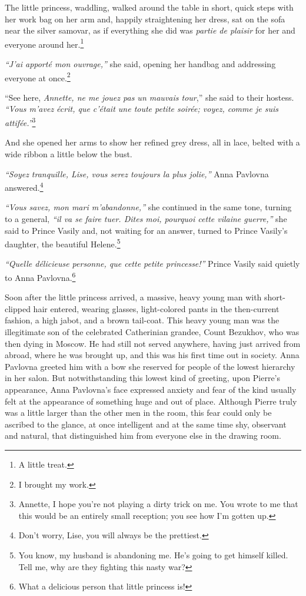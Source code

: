 The little princess, waddling, walked around the table in short, quick
steps with her work bag on her arm and, happily straightening her
dress, sat on the sofa near the silver samovar, as if everything she
did was \textit{partie de plaisir} for her and everyone around
her.\footnote{A little treat.}

\textit{``J'ai apport\'e mon ouvrage,''} she said, opening her handbag
and addressing everyone at once.\footnote{I brought my work.}

``See here, \textit{Annette, ne me jouez pas un mauvais tour},'' she
said to their hostess. \textit{``Vous m'avez \'ecrit, que c'\'etait
  une toute petite soir\'ee; voyez, comme je suis
  attif\'ee.''}\footnote{Annette, I hope you're not playing a dirty
  trick on me. You wrote to me that this would be an entirely small
  reception; you see how I'm gotten up.}

And she opened her arms to show her refined grey dress, all in lace,
belted with a wide ribbon a little below the bust.

\textit{``Soyez tranquille, Lise, vous serez toujours la plus
  jolie,''} Anna Pavlovna answered.\footnote{Don't worry, Lise, you
  will always be the prettiest.}

\textit{``Vous savez, mon mari m'abandonne,''} she continued in the
same tone, turning to a general, \textit{``il va se faire tuer. Dites
  moi, pourquoi cette vilaine guerre,''} she said to Prince Vasily
and, not waiting for an answer, turned to Prince Vasily's daughter,
the beautiful Helene.\footnote{You know, my husband is abandoning
  me. He's going to get himself killed. Tell me, why are they fighting
  this nasty war?}

\textit{``Quelle d\'elicieuse personne, que cette petite princesse!''}
Prince Vasily said quietly to Anna Pavlovna.\footnote{What a delicious
  person that little princess is!}

Soon after the little princess arrived, a massive, heavy young man
with short-clipped hair entered, wearing glasses, light-colored pants
in the then-current fashion, a high jabot, and a brown tail-coat. This
heavy young man was the illegitimate son of the celebrated Catherinian
grandee, Count Bezukhov, who was then dying in Moscow. He had still
not served anywhere, having just arrived from abroad, where he was
brought up, and this was his first time out in society. Anna Pavlovna
greeted him with a bow she reserved for people of the lowest hierarchy
in her salon. But notwithstanding this lowest kind of greeting, upon
Pierre's appearance, Anna Pavlovna's face expressed anxiety and fear
of the kind usually felt at the appearance of something huge and out
of place. Although Pierre truly was a little larger than the other men
in the room, this fear could only be ascribed to the glance, at once
intelligent and at the same time shy, observant and natural, that
distinguished him from everyone else in the drawing room.

